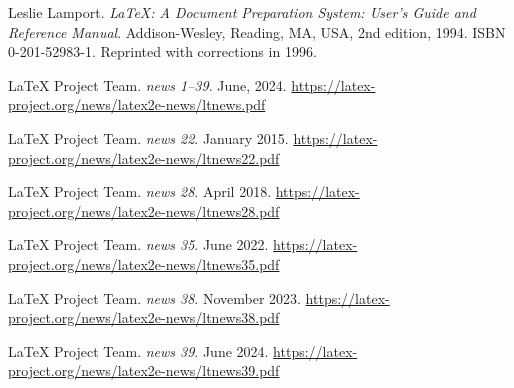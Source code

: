 \documentclass{ltnews}
\begin{document}
\begin{thebibliography}{9}\frenchspacing


Leslie Lamport.
\newblock \emph{{\LaTeX}: {A} Document Preparation System: User's Guide and Reference
  Manual}.
\newblock \mbox{Addison}-Wesley, Reading, MA, USA, 2nd edition, 1994.
\newblock ISBN 0-201-52983-1.
\newblock Reprinted with corrections in 1996.

 \LaTeX{} Project Team.
  \emph{\LaTeXe{} news 1--39}. June, 2024.
  \url{https://latex-project.org/news/latex2e-news/ltnews.pdf}

 \LaTeX{} Project Team.
  \emph{\LaTeXe{} news 22}. January 2015.
  \url{https://latex-project.org/news/latex2e-news/ltnews22.pdf}

 \LaTeX{} Project Team.
  \emph{\LaTeXe{} news 28}. April 2018.
  \url{https://latex-project.org/news/latex2e-news/ltnews28.pdf}

 \LaTeX{} Project Team.
  \emph{\LaTeXe{} news 35}. June 2022.
  \url{https://latex-project.org/news/latex2e-news/ltnews35.pdf}

 \LaTeX{} Project Team.
  \emph{\LaTeXe{} news 38}. November 2023.
  \url{https://latex-project.org/news/latex2e-news/ltnews38.pdf}

 \LaTeX{} Project Team.
  \emph{\LaTeXe{} news 39}. June 2024.
  \url{https://latex-project.org/news/latex2e-news/ltnews39.pdf}

\end{thebibliography}
\end{document}
